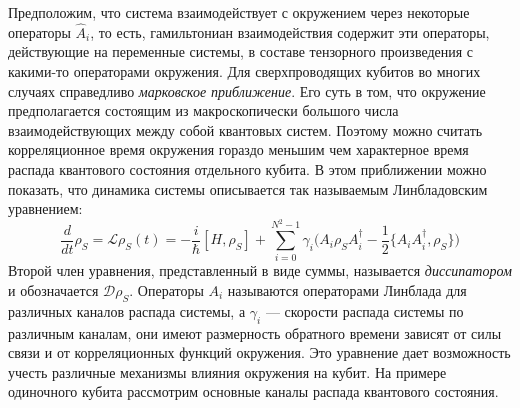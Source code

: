 Предположим, что система взаимодействует с окружением через некоторые операторы $\hat{A}_i$, то есть, гамильтониан взаимодействия содержит эти операторы, действующие на переменные системы, в составе тензорного произведения с какими-то операторами окружения. Для сверхпроводящих кубитов во многих случаях справедливо \textit{марковское приближение}. Его суть в том, что окружение предполагается состоящим из макроскопически большого числа  взаимодействующих между собой квантовых систем. Поэтому можно считать корреляционное время окружения гораздо меньшим чем характерное время распада квантового состояния отдельного кубита. В этом приближении можно показать, что динамика системы описывается так называемым Линбладовским уравнением:
\begin{equation}
\frac{d}{dt}\rho_S = \mathcal{L}\rho_S(t) = -\frac{i}{\hbar}[H, \rho_S] + \sum_{i=0}^{N^2-1}\gamma_i\big( A_i\rho_SA^\dag_i -\frac{1}{2}\{ A_iA^\dagger_i, \rho_S\}\big)
\label{eq: Master_L}
\end{equation}
Второй член уравнения, представленный в виде суммы, называется \textit{диссипатором} и обозначается $\mathcal{D}\rho_S$. Операторы $A_i$ называются операторами Линблада для различных каналов распада системы, а $\gamma_i$ --- скорости распада системы по различным каналам, они имеют размерность обратного времени зависят от силы связи и от корреляционных функций окружения. Это уравнение дает возможность учесть различные механизмы влияния окружения на кубит. На примере одиночного кубита рассмотрим основные каналы распада квантового состояния. 

